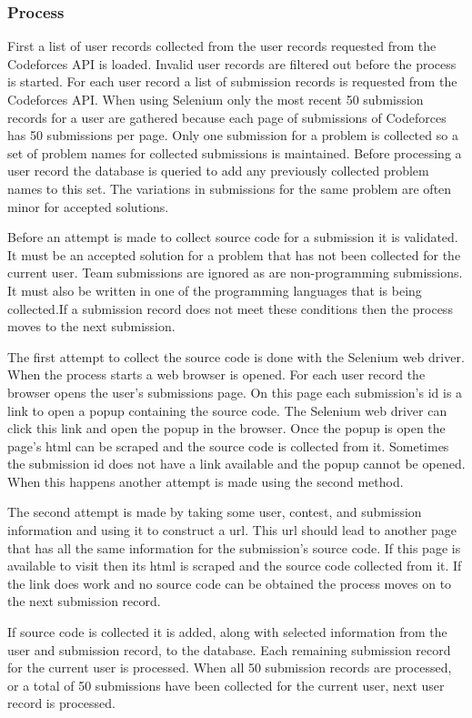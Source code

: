 \documentclass[12pt]{article}
\begin{document}
\subsubsection*{Process}
First a list of user records collected from the user records requested from the Codeforces API is loaded. Invalid user records are filtered out before the process is started. For each user record a list of submission records is requested from the Codeforces API. When using Selenium only the most recent 50 submission records for a user are gathered because each page of submissions of Codeforces has 50 submissions per page. Only one submission for a problem is collected so a set of problem names for collected submissions is maintained. Before processing a user record the database is queried to add any previously collected problem names to this set.  The variations in submissions for the same problem are often minor for accepted solutions.

Before an attempt is made to collect source code for a submission it is validated. It must be an accepted solution for a problem that has not been collected for the current user. Team submissions are ignored as are non-programming submissions. It must also be written in one of the programming languages that is being collected.If a submission record does not meet these conditions then the process moves to the next submission.

The first attempt to collect the source code is done with the Selenium web driver. When the process starts a web browser is opened. For each user record the browser opens the user's submissions page. On this page each submission's id is a link to open a popup containing the source code. The Selenium web driver can click this link and open the popup in the browser. Once the popup is open the page's html can be scraped and the source code is collected from it. Sometimes the submission id does not have a link available and the popup cannot be opened. When this happens another attempt is made using the second method.

The second attempt is made by taking some user, contest, and submission information and using it to construct a url. This url should lead to another page that has all the same information for the submission's source code. If this page is available to visit then its html is scraped and the source code collected from it. If the link does work and no source code can be obtained the process moves on to the next submission record.

If source code is collected it is added, along with selected information from the user and submission record, to the database. Each remaining submission record for the current user is processed. When all 50 submission records are processed, or a total of 50 submissions have been collected for the current user, next user record is processed.
\end{document}
